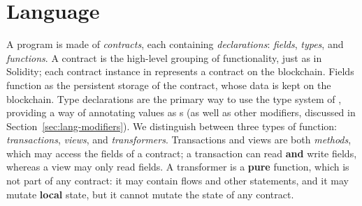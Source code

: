 \documentclass[dvipsnames, usenames, sigconf]{acmart}
\begin{document}



\section{Language}\label{sec:lang}
A \langName program is made of \emph{contracts}, each containing \emph{declarations}: \emph{fields}, \emph{types}, and \emph{functions}.
A contract is the high-level grouping of functionality, just as in Solidity; each contract instance in \langName represents a contract on the blockchain.
Fields function as the persistent storage of the contract, whose data is kept on the blockchain.
Type declarations are the primary way to use the type system of \langName, providing a way of annotating values as \assetTxt{}s (as well as other modifiers, discussed in Section~\ref{sec:lang-modifiers}).
We distinguish between three types of function: \emph{transactions}, \emph{views}, and \emph{transformers}.
Transactions and views are both \emph{methods}, which may access the fields of a contract; a transaction can read \textbf{and} write fields, whereas a view may only read fields.
A transformer is a \textbf{pure} function, which is not part of any contract: it may contain flows and other statements, and it may mutate \textbf{local} state, but it cannot mutate the state of any contract.
\end{document}
